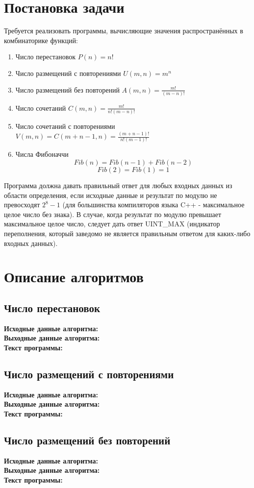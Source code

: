 \documentclass[zuev-report.tex]{subfiles}
\begin{document}
\section{Постановка задачи}
Требуется реализовать программы, вычисляющие значения распространённых в комбинаторике функций:\\
\begin{enumerate}
	\item Число перестановок $P(n)=n!$
	\item Число размещений с повторениями $U(m,n)=m^n$
	\item Число размещений без повторений $A(m,n)=\frac{m!}{(m−n)!}$
	\item Число сочетаний $C(m,n)=\frac{m!}{n!(m−n)!}$
	\item Число сочетаний с повторениями $V(m,n)=C(m+n−1,n)=\frac{(m+n−1)!}{n!(m−1)!}$
	\item Числа Фибоначчи 
	$$Fib(n)=Fib(n-1)+Fib(n-2)$$
	$$Fib(2)=Fib(1)=1$$
\end{enumerate}
Программа должна давать правильный ответ для любых входных данных из области определения, если исходные данные и результат по модулю не превосходят $2^{8}-1$ (для большинства компиляторов языка C++ - максимальное целое число без знака). В случае, когда результат по модулю превышает максимальное целое число, следует дать ответ UINT\_MAX (индикатор переполнения, который заведомо не является правильным ответом для каких-либо входных данных).
\section{Описание алгоритмов}
\def \txtIn {\textbf{Исходные данные алгоритма:}\\}
\def \txtOut {\textbf{Выходные данные алгоритма:}\\}
\def \txtTxt {\textbf{Текст программы:}}
\subsection{Число перестановок}
\txtIn
\txtOut
\txtTxt
\label{permutations}

\subsection{Число размещений с повторениями}
\txtIn
\txtOut
\txtTxt
\label{perm_with_repet}

\subsection{Число размещений без повторений}
\txtIn
\txtOut
\txtTxt
\label{perm_no_repet}

\end{document}
